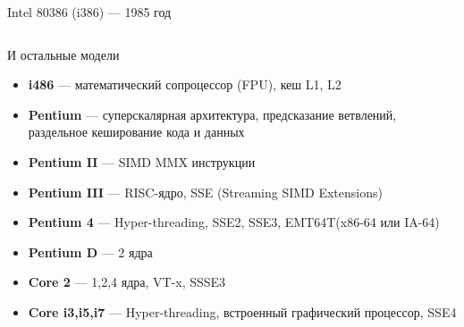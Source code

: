 \documentclass{beamer}
\begin{document}
\begin{frame}{Intel 80386 (i386) --- 1985 год}
\begin{columns}
    \end{columns}
    \end{frame}
    \begin{frame}{И остальные модели}
    	\begin{itemize}
    		\item {\bf i486} --- математический сопроцессор (FPU), кеш L1, L2
    		\item {\bf Pentium} --- суперскалярная архитектура, предсказание ветвлений, раздельное кеширование кода и данных
    		\item {\bf Pentium II} --- SIMD MMX инструкции
    		\item {\bf Pentium III} --- RISC-ядро, SSE (Streaming SIMD Extensions)
    		\item {\bf Pentium 4} --- Hyper-threading, SSE2, SSE3, EMT64T(x86-64 или IA-64)
    		\item {\bf Pentium D} --- 2 ядра
    		\item {\bf Core 2} --- 1,2,4 ядра, VT-x, SSSE3
    		\item {\bf Core i3,i5,i7} --- Hyper-threading, встроенный графический процессор, SSE4

    	\end{itemize}
    \end{frame}
\end{document}
